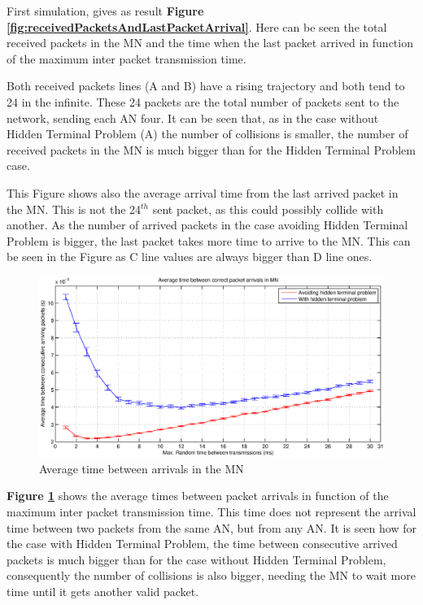 First simulation, gives as result \textbf{Figure \ref{fig:receivedPacketsAndLastPacketArrival}}. Here can be seen the total received packets in the 
\ac{MN} and the time when the last packet arrived in function of the maximum inter packet transmission time.

Both received packets lines (A and B) have a rising trajectory and both tend to 24 in the infinite. These 24 packets are the total number of 
packets sent to the network, sending each \ac{AN} four. It can be seen that, as in the case without Hidden Terminal Problem (A) the number of collisions
is smaller, the number of received packets in the \ac{MN} is much bigger than for the Hidden Terminal Problem case.

This Figure shows also the average arrival time from the last arrived packet in the \ac{MN}. This is not the 24$^{th}$ sent packet, as this could 
possibly collide with another. As the number of arrived packets in the case avoiding Hidden Terminal Problem is bigger, the last packet takes more time 
to arrive to the \ac{MN}. This can be seen in the Figure as C line values are always bigger than D line ones.

\begin{figure}[ht]
 \begin{center}
  \includegraphics[width=1\textwidth]{averageTimeBetweenArrivals.eps}
 \end{center}
 \caption{Average time between arrivals in the \ac{MN}}
 \label{fig:averageTimeBetweenArrivals}
\end{figure}

\textbf{Figure \ref{fig:averageTimeBetweenArrivals}} shows the average times between packet arrivals in function of the maximum inter packet 
transmission time. This time does not represent the arrival time between two packets from the same \ac{AN}, but from any \ac{AN}. It is seen how
for the case with Hidden Terminal Problem, the time between consecutive arrived packets is much bigger than for the case without Hidden Terminal Problem,
consequently the number of collisions is also bigger, needing the \ac{MN} to wait more time until it gets another valid packet.

